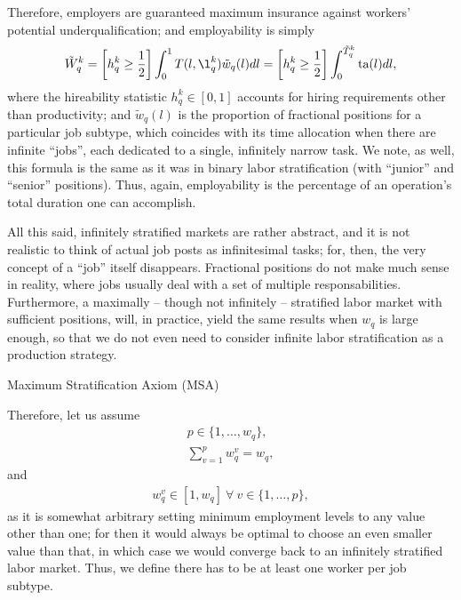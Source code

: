 \documentclass[hidelinks, nonatbib]{elsarticle}
\begin{document}
\begin{enumerate}
Therefore, employers are guaranteed maximum insurance against workers' potential underqualification; and employability is simply
\begin{gather}
    \tilde{W}_{q}^{k} 
    = 
    \left[
        h_{q}^{k}
        \geq
        \frac{1}{2}
    \right]
    \int_{0}^{1}
    T(l, \l_{q}^{k})
    \tilde{w}_{q}(l)
    dl
    = 
    \left[
        h_{q}^{k}
        \geq
        \frac{1}{2}
    \right]
    \int_{0}^{\tilde{T}_{q}^{k}}
    \text{ta}(l)
    dl
    ,
\end{gather}
where the hireability statistic $h_{q}^{k} \in [0,1]$ accounts for hiring requirements other than productivity; and $\tilde{w}_{q}(l)$ is the proportion of fractional positions for a particular job subtype, which coincides with its time allocation when there are infinite ``jobs'', each dedicated to a single, infinitely narrow task. We note, as well, this formula is the same as it was in binary labor stratification (with ``junior'' and ``senior'' positions). Thus, again, employability is the percentage of an operation's total duration one can accomplish.

All this said, infinitely stratified markets are rather abstract, and it is not realistic to think of actual job posts as infinitesimal tasks; for, then, the very concept of a ``job'' itself disappears. Fractional positions do not make much sense in reality, where jobs usually deal with a set of multiple responsabilities. Furthermore, a maximally -- though not infinitely -- stratified labor market with sufficient positions, will, in practice, yield the same results when $w_q$ is large enough, so that we do not even need to consider  infinite labor stratification as a production strategy.

Maximum Stratification Axiom (MSA)

Therefore, let us assume
\begin{gather}
    p \in \{1, \dots, w_q\}
    ,
    \\
    \sum_{v=1}^{p}
    w_{q}^{v}
    =
    w_q
    ,
\end{gather}
and
\begin{gather}
    w_{q}^{v} 
    \in 
    [1, w_q]
    \
    \forall
    \
    v \in \{1, \dots, p\}
    ,
\end{gather}
as it is somewhat arbitrary setting minimum employment levels to any value other than one; for then it would always be optimal to choose an even smaller value than that, in which case we would converge back to an infinitely stratified labor market. Thus, we define there has to be at least one worker per job subtype.


\end{enumerate}
\end{document}
